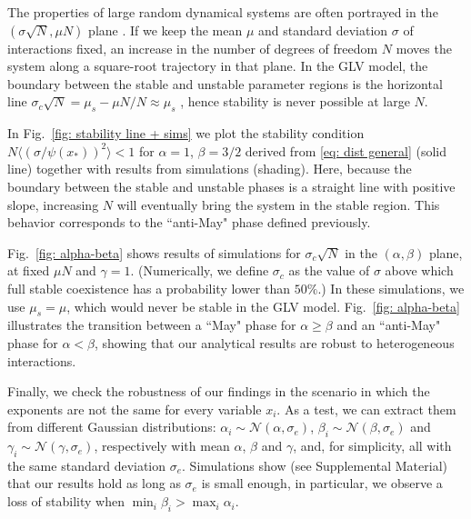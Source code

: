 \documentclass[
 prl,
 twocolumn,
 amsmath,
 amssymb,
 aps,
]{revtex4-2}
\begin{document}
The properties of large random dynamical systems are often portrayed in the $(\sigma \sqrt{N},\mu N)$ plane \cite{bunin2017ecological}.
If we keep the mean $\mu$ and standard deviation $\sigma$ of interactions fixed, an increase in the number of degrees of freedom $N$ moves the system along a square-root trajectory in that plane. In the GLV model, the boundary between the stable and unstable parameter regions is the horizontal line $\sigma_c\sqrt{N} = \mu_s - \mu N / N \approx \mu_s$ \cite{bunin2017ecological}, hence stability is never possible at large $N$. 

In Fig.~\ref{fig: stability line + sims} we plot the stability condition $N\langle (\sigma/\psi(x_*))^2\rangle < 1$ for $\alpha = 1$, $\beta = 3/2$ derived from \eqref{eq: dist general} (solid line) together with results from simulations (shading). Here, because the boundary between the stable and unstable phases is a straight line with positive slope, increasing $N$ will eventually bring the system in the stable region. This behavior corresponds to the ``anti-May" phase defined previously. 

Fig.~\ref{fig: alpha-beta} shows results of simulations for $\sigma_c\sqrt{N}$ in the $(\alpha,\beta)$ plane, at fixed $\mu N$ and $\gamma = 1$. (Numerically, we define $\sigma_c$ as the value of $\sigma$ above which full stable coexistence has a probability lower than $50\%$.) In these simulations, we use $\mu_s = \mu$, which would never be stable in the GLV model. Fig.~\ref{fig: alpha-beta} illustrates the transition between a ``May" phase for $\alpha \geq \beta$ and an ``anti-May" phase for $\alpha < \beta$, showing that our analytical results are robust to heterogeneous interactions.

Finally, we check the robustness of our findings in the scenario in which the exponents are not the same for every variable $x_i$. As a test, we can extract them from different Gaussian distributions: $\alpha_i\sim\mathcal N(\alpha,\sigma_e)$, $\beta_i\sim\mathcal N(\beta,\sigma_e)$ and $\gamma_i\sim\mathcal N(\gamma,\sigma_e)$, respectively with mean $\alpha$, $\beta$ and $\gamma$, and, for simplicity, all with the same standard deviation $\sigma_e$. 
Simulations show (see Supplemental Material) that our results hold as long as $\sigma_e$ is small enough, in particular, we observe a loss of stability when $\min_i\beta_i>\max_i\alpha_i$.

\end{document}
